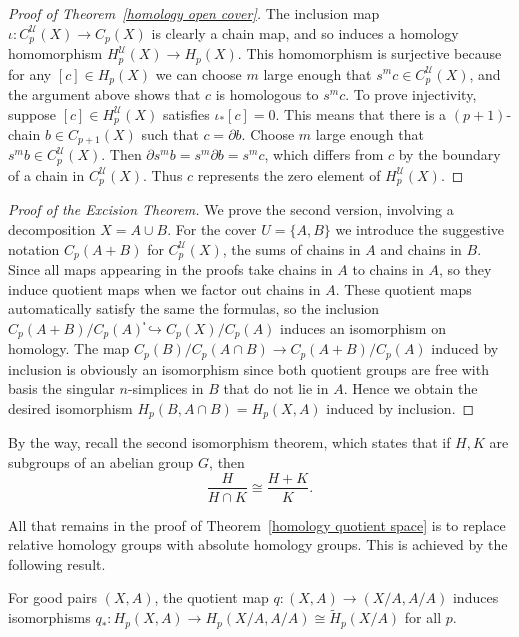 \begin{proof}[Proof of Theorem~\ref{homology open cover}]
The inclusion map $\iota:C^\mathcal{U}_p(X)\to C_p(X)$ is clearly a chain map, and so induces a homology homomorphism $H^\mathcal{U}_p(X)\to H_p(X)$. This homomorphism is surjective because for any $[c]\in H_p(X)$ we can choose $m$ large enough that $s^mc\in C^\mathcal{U}_p(X)$, and the argument above shows that $c$ is homologous to $s^mc$. To prove injectivity, suppose $[c]\in H^\mathcal{U}_p(X)$ satisfies $\iota_*[c]=0$. This means that there is a $(p+1)$-chain $b\in C_{p+1}(X)$ such that $c=\partial b$. Choose $m$ large enough that $s^mb\in C^\mathcal{U}_p(X)$. Then $\partial s^mb=s^m\partial b=s^mc$, which differs from $c$ by the boundary of a chain in $C^\mathcal{U}_p(X)$.
Thus $c$ represents the zero element of $H^\mathcal{U}_p(X)$.
\end{proof}
\begin{proof}[Proof of the Excision Theorem]
We prove the second version, involving a decomposition $X=A\cup B$. For the cover $U=\{A,B\}$ we introduce the suggestive notation $C_p(A+B)$ for $C^\mathcal{U}_p(X)$, the sums of chains in $A$ and chains in $B$. Since all maps appearing in the proofs take chains in $A$ to chains in $A$, so they induce quotient maps when we factor out chains in $A$. These quotient maps automatically satisfy the same the formulas, so the inclusion $C_p(A+B)/C_p(A)֓\hookrightarrow C_p(X)/C_p(A)$ induces an isomorphism on homology. The map $C_p(B)/C_p(A\cap B)\to C_p(A+B)/C_p(A)$ induced by inclusion is obviously an isomorphism since both quotient groups are free with basis the singular $n$-simplices in $B$ that do not lie in $A$. Hence we obtain the desired isomorphism $H_p(B,A\cap B)=H_p(X,A)$ induced by inclusion.
\end{proof}
\begin{remark}
By the way, recall the second isomorphism theorem, which states that if $H,K$ are subgroups of an abelian group $G$, then
\[\dfrac{H}{H\cap K}\cong\dfrac{H+K}{K}.\]
\end{remark}
All that remains in the proof of Theorem~\ref{homology quotient space} is to replace relative homology groups with absolute homology groups. This is achieved by the following result.
\begin{proposition}\label{homology reduced and quotient}
For good pairs $(X,A)$, the quotient map $q:(X,A)\to(X/A,A/A)$
induces isomorphisms $q_*:H_p(X,A)\to H_p(X/A,A/A)\cong\widetilde{H}_p(X/A)$ for all $p$.
\end{proposition}
